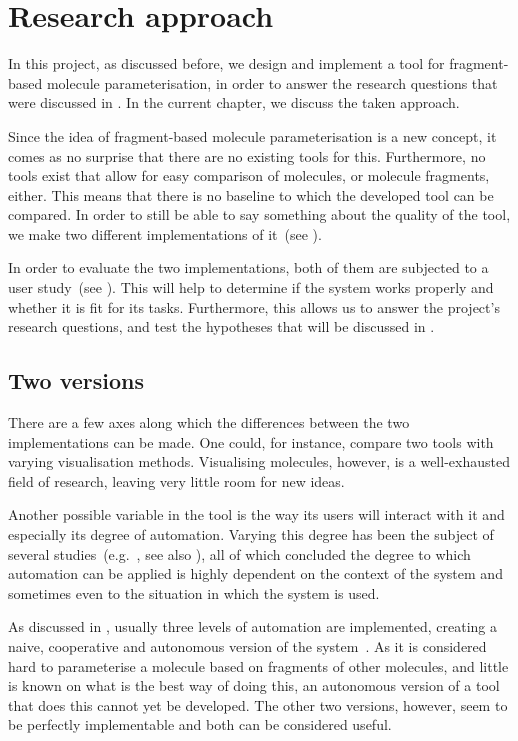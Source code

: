 \chapter{Research approach}

In this project, as discussed before, we design and implement a tool for fragment-based molecule parameterisation, in order to answer the research questions that were discussed in . In the current chapter, we discuss the taken approach. 

Since the idea of fragment-based molecule parameterisation is a new concept, it comes as no surprise that there are no existing tools for this. Furthermore, no tools exist that allow for easy comparison of molecules, or molecule fragments, either. This means that there is no baseline to which the developed tool can be compared. In order to still be able to say something about the quality of the tool, we make two different implementations of it~(see ).

In order to evaluate the two implementations, both of them are subjected to a user study~(see ). This will help to determine if the system works properly and whether it is fit for its tasks. Furthermore, this allows us to answer the project's research questions, and test the hypotheses that will be discussed in .



\section{Two versions}
There are a few axes along which the differences between the two implementations can be made. One could, for instance, compare two tools with varying visualisation methods. Visualising molecules, however, is a well-exhausted field of research, leaving very little room for new ideas.

Another possible variable in the tool is the way its users will interact with it and especially its degree of automation. Varying this degree has been the subject of several studies~(e.g.~\cite{payne2000varying, horvitz1999principles, marcus1987taking, norman1990problem}, see also ), all of which concluded the degree to which automation can be applied is highly dependent on the context of the system and sometimes even to the situation in which the system is used.

As discussed in , usually three levels of automation are implemented, creating a naive, cooperative and autonomous version of the system~\cite{payne2000varying}. As it is considered hard to parameterise a molecule based on fragments of other molecules, and little is known on what is the best way of doing this, an autonomous version of a tool that does this cannot yet be developed. The other two versions, however, seem to be perfectly implementable and both can be considered useful.

